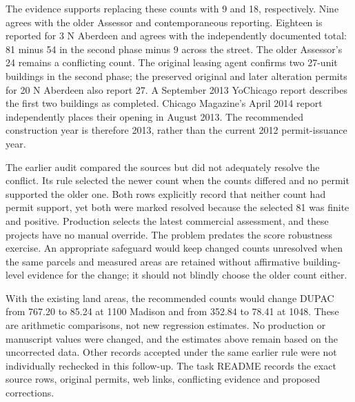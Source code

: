 The evidence supports replacing these counts with 9 and 18, respectively.
Nine agrees with the older Assessor and contemporaneous reporting.
Eighteen is reported for 3 N Aberdeen and agrees with the independently
documented total: 81 minus 54 in the second phase minus 9 across the
street. The older Assessor's 24 remains a conflicting count. The original
leasing agent confirms two 27-unit buildings in the second phase; the
preserved original and later alteration permits for 20 N Aberdeen also
report 27. A September 2013 YoChicago report describes the first two
buildings as completed. Chicago Magazine's April 2014 report independently
places their opening in August 2013. The recommended construction year
is therefore 2013, rather than the current 2012 permit-issuance year.

The earlier audit compared the sources but did not adequately resolve
the conflict. Its rule selected the newer count when the counts differed
and no permit supported the older one. Both rows explicitly record that
neither count had permit support, yet both were marked resolved because
the selected 81 was finite and positive. Production selects the latest
commercial assessment, and these projects have no manual override. The
problem predates the score robustness exercise. An appropriate safeguard
would keep changed counts unresolved when the same parcels and measured
areas are retained without affirmative building-level evidence for the
change; it should not blindly choose the older count either.

With the existing land areas, the recommended counts would change DUPAC
from 767.20 to 85.24 at 1100 Madison and from 352.84 to 78.41 at 1048.
These are arithmetic comparisons, not new regression estimates. No
production or manuscript values were changed, and the estimates above
remain based on the uncorrected data. Other records accepted under the
same earlier rule were not individually rechecked in this follow-up.
The task README records the exact source rows, original permits, web
links, conflicting evidence and proposed corrections.
